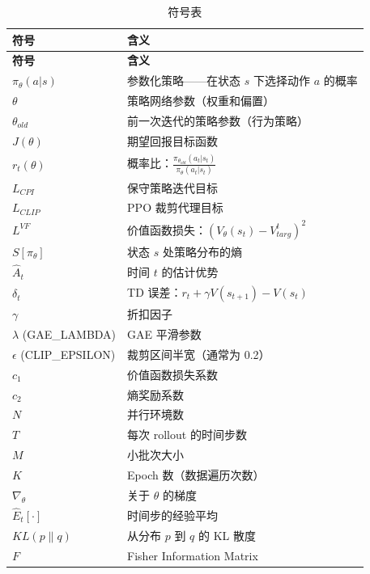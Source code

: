 \documentclass[12pt,a4paper]{article}
\theoremstyle{noteplain}
\theoremstyle{noteexercise}
\begin{document}
\begin{longtable}{m{3cm}m{7cm}}
  \caption{符号表} \label{tab:symbols} \\
  \toprule
  \textbf{符号} & \textbf{含义} \\
  \midrule
  \endfirsthead
  \toprule
  \textbf{符号} & \textbf{含义} \\
  \midrule
  \endhead
  \bottomrule
  \endlastfoot

  $\pi_\theta(a|s)$ & 参数化策略——在状态 $s$ 下选择动作 $a$ 的概率 \\
  $\theta$ & 策略网络参数（权重和偏置） \\
  $\theta_{old}$ & 前一次迭代的策略参数（行为策略） \\
  $J(\theta)$ & 期望回报目标函数 \\
  $r_t(\theta)$ & 概率比：$\frac{\pi_{\theta_{old}}(a_t|s_t)}{\pi_\theta(a_t|s_t)}$ \\
  $L_{CPI}$ & 保守策略迭代目标 \\
  $L_{CLIP}$ & PPO 裁剪代理目标 \\
  $L^{VF}$ & 价值函数损失：$(V_\theta(s_t) - V_{targ}^t)^2$ \\
  $S[\pi_\theta]$ & 状态 $s$ 处策略分布的熵 \\
  $\hat{A}_t$ & 时间 $t$ 的估计优势 \\
  $\delta_t$ & TD 误差：$r_t + \gamma V(s_{t+1}) - V(s_t)$ \\
  $\gamma$ & 折扣因子 \\
  $\lambda$ (GAE\_LAMBDA) & GAE 平滑参数 \\
  $\epsilon$ (CLIP\_EPSILON) & 裁剪区间半宽（通常为 0.2） \\
  $c_1$ & 价值函数损失系数 \\
  $c_2$ & 熵奖励系数 \\
  $N$ & 并行环境数 \\
  $T$ &每次 rollout 的时间步数 \\
  $M$ & 小批次大小 \\
  $K$ & Epoch 数（数据遍历次数） \\
  $\nabla_\theta$ & 关于 $\theta$ 的梯度 \\
  $\hat{E}_t[\cdot]$ & 时间步的经验平均 \\
  $KL(p \| q)$ & 从分布 $p$ 到 $q$ 的 KL 散度 \\
  $F$ & Fisher Information Matrix \\
\end{longtable}

\end{document}
